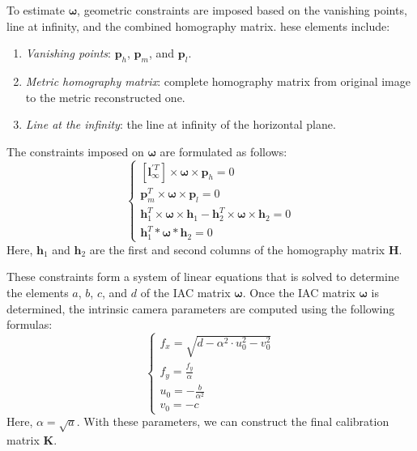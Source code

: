 \documentclass{Academic}
\begin{document}
To estimate $\boldsymbol{\omega}$, geometric constraints are imposed based on the vanishing points, line at infinity, and the combined homography matrix.
hese elements include:
\begin{enumerate}
    \item \textit{Vanishing points}: $\mathbf{p}_h$, $\mathbf{p}_m$, and $\mathbf{p}_l$.
    \item \textit{Metric homography matrix}: complete homography matrix from original image to the metric reconstructed one. 
    \item \textit{Line at the infinity}: the line at infinity of the horizontal plane.
\end{enumerate}
\noindent The constraints imposed on $\boldsymbol{\omega}$ are formulated as follows:
\begin{equation}
\label{eqn:constraints}
\begin{cases}
    \left[\mathbf{l}_{\infty}^{\prime T}\right] \times \boldsymbol{\omega} \times \mathbf{p}_h = 0 \\
    \mathbf{p}_m^T \times \boldsymbol{\omega} \times \mathbf{p}_l = 0  \\
    \mathbf{h}_1^T \times \boldsymbol{\omega} \times \mathbf{h}_1 - \mathbf{h}_2^T \times \boldsymbol{\omega} \times \mathbf{h}_2 = 0 \\
    \mathbf{h}_1^T * \boldsymbol{\omega} * \mathbf{h}_2 = 0
\end{cases}\end{equation}
Here, $\mathbf{h}_1$ and $\mathbf{h}_2$ are the first and second columns of the homography matrix $\mathbf{H}$. 

\noindent These constraints form a system of linear equations that is solved to determine the elements $a$, $b$, $c$, and $d$ of the IAC matrix $\boldsymbol{\omega}$.
\noindent Once the IAC matrix $\boldsymbol{\omega}$ is determined, the intrinsic camera parameters are computed using the following formulas:
\begin{equation}
\begin{cases}
    f_x = \sqrt{d - \alpha^2 \cdot u_0^2 - v_0^2} \\
    f_y = \frac{f_y}{\alpha} \\
    u_0 = - \frac{b}{\alpha^2} \\
    v_0 = - c
\end{cases}
\end{equation}
Here, $\alpha = \sqrt{a}$. 
With these parameters, we can construct the final calibration matrix $\mathbf{K}$.
\end{document}
